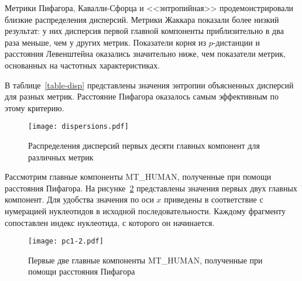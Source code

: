 Метрики Пифагора, Кавалли-Сфорца и <<энтропийная>> продемонстрировали близкие распределения дисперсий. Метрики Жаккара показали более низкий результат: у них дисперсия первой главной компоненты приблизительно в два раза меньше, чем у других метрик. Показатели корня из $p$-дистанции и расстояния Левенштейна оказались значительно ниже, чем показатели метрик, основанных на частотных характеристиках.

В таблице~\ref{table-disp} представлены значения энтропии объясненных дисперсий для разных метрик. Расстояние Пифагора оказалось самым эффективным по этому критерию.

\begin{figure}[!t]
  \centering
  \texttt{[image: dispersions.pdf]}
  \caption{Распределения дисперсий первых десяти главных компонент для различных метрик}
  \label{dispersions}
\end{figure}

\begin{table}[h!]
  \caption{Энтропия распределения дисперсий главных компонент для различных евклидовых метрик}
  \label{table-disp}
\end{table}

Рассмотрим главные компоненты MT\_HUMAN, полученные при помощи расстояния Пифагора. На рисунке~\ref{pc1-2} представлены значения первых двух главных компонент. Для удобства значения по оси $x$ приведены в соответствие с нумерацией нуклеотидов в исходной последовательности. Каждому фрагменту сопоставлен индекс нуклеотида, с которого он начинается.

\begin{figure}[!t]
  \centering
  \texttt{[image: pc1-2.pdf]}
  \caption{Первые две главные компоненты MT\_HUMAN, полученные при помощи расстояния Пифагора}
  \label{pc1-2}
\end{figure}

